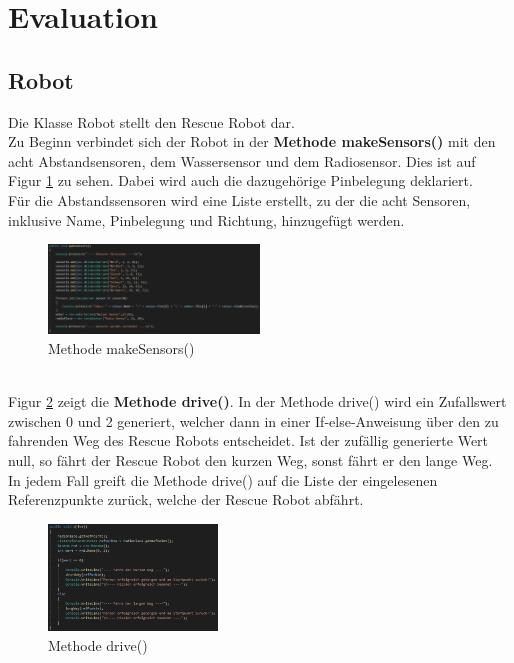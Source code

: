 \section{Evaluation}

\subsection{Robot}
\label{Robot}
Die Klasse Robot stellt den Rescue Robot dar.\\
Zu Beginn verbindet sich der Robot in der \textbf{Methode makeSensors()} mit den acht Abstandsensoren, dem Wassersensor und dem Radiosensor. Dies ist auf Figur \ref{fig:makesensors} zu sehen. Dabei wird auch die dazugehörige Pinbelegung deklariert.\\
Für die Abstandssensoren wird eine Liste erstellt, zu der die acht Sensoren, inklusive Name,  Pinbelegung und Richtung, hinzugefügt werden.
\begin{figure}[htbp] 
  \centering
     \includegraphics[width=0.5\textwidth]{Bilder/makeSensors.PNG}
  \caption{Methode makeSensors()}
  \label{fig:makesensors}
\end{figure}\\
Figur \ref{fig:drive} zeigt die \textbf{Methode drive()}. In der Methode drive() wird ein Zufallswert zwischen 0 und 2 generiert, welcher dann in einer If-else-Anweisung über den zu fahrenden Weg des Rescue Robots entscheidet. Ist der zufällig generierte Wert null, so fährt der Rescue Robot den kurzen Weg, sonst fährt er den lange Weg.\\
In jedem Fall greift die Methode drive() auf die Liste der eingelesenen Referenzpunkte zurück, welche der Rescue Robot abfährt.
\begin{figure}[htbp] 
  \centering
     \includegraphics[width=0.4\textwidth]{Bilder/drive.PNG}
  \caption{Methode drive()}
  \label{fig:drive}
\end{figure}\\
